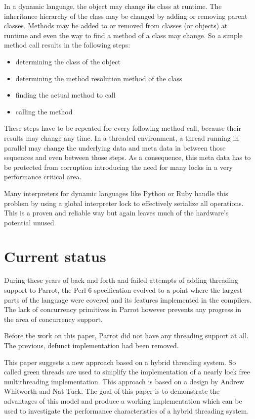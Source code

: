 \documentclass[bachelor,english]{hgbthesis}
\begin{document}
In a dynamic language, the object may change its class at runtime. The inheritance hierarchy of the class may be changed by adding or removing parent classes. Methods may be added to or removed from classes (or objects) at runtime and even the way to find a method of a class may change. So a simple method call results in the following steps:
%
\begin{itemize}
\item determining the class of the object
\item determining the method resolution method of the class
\item finding the actual method to call
\item calling the method
\end{itemize}
%
These steps have to be repeated for every following method call, because their results may change any time. In a threaded environment, a thread running in parallel may change the underlying data and meta data in between those sequences and even between those steps. As a consequence, this meta data has to be protected from corruption introducing the need for many locks in a very performance critical area.

Many interpreters for dynamic languages like Python or Ruby handle this problem by using a global interpreter lock to effectively serialize all operations. This is a proven and reliable way but again leaves much of the hardware's potential unused.

\section{Current status}

During these years of back and forth and failed attempts of adding threading support to Parrot, the Perl 6 specification evolved to a point where the largest parts of the language were covered and its features implemented in the compilers. The lack of concurrency primitives in Parrot however prevents any progress in the area of concurrency support.

Before the work on this paper, Parrot did not have any threading support at all. The previous, defunct implementation had been removed.

This paper suggests a new approach based on a hybrid threading system. So called green threads are used to simplify the implementation of a nearly lock free multithreading implementation. This approach is based on a design by Andrew Whitworth and Nat Tuck. The goal of this paper is to demonstrate the advantages of this model and produce a working implementation which can be used to investigate the performance characteristics of a hybrid threading system.
\end{document}

